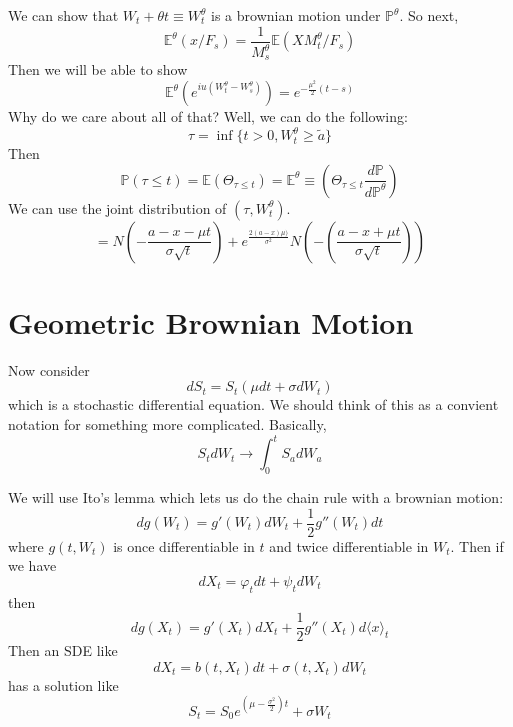 \documentclass[twocolumn,openany]{book}
\begin{document}
We can show that $W_t + \theta t \equiv W_t^\theta$ is a brownian motion under $\mathbb{P}^\theta$. So next,
\begin{equation}
	\mathbb{E}^\theta \left( x / F_s\right) = \frac{1}{M^\theta_s} \mathbb{E}(X M^\theta_t / F_s) 
\end{equation}
Then we will be able to show
\begin{equation}
	\mathbb{E}^\theta \left( e^{iu(W_t^\theta - W_s^\theta)} \right) = e^{-\frac{\mu^2}{2}(t-s)}
\end{equation}
Why do we care about all of that? Well, we can do the following:
\begin{equation}
	\tau = \inf \{ t> 0, W_t^\theta \geq \tilde{a} \}
\end{equation}
Then
\begin{equation}
	\mathbb{P}(\tau \leq t) = \mathbb{E}(\Theta_{\tau \leq t}) = \mathbb{E}^\theta \equiv \left( \Theta_{\tau \leq t} \frac{d\mathbb{P}}{d\mathbb{P}^\theta} \right)
\end{equation}
We can use the joint distribution of $(\tau, W_t^\theta)$.
\begin{equation}
	= N( -\frac{a - x - \mu t}{\sigma \sqrt{t}}) + e^{\frac{2(a-x)\mu)}{\sigma^2}} N(-\left( \frac{a - x + \mu t}{\sigma \sqrt{t}}\right))
\end{equation}

\section{Geometric Brownian Motion}
Now consider
\begin{equation}
	dS_t = S_t (\mu dt + \sigma dW_t)
\end{equation}
which is a stochastic differential equation. We should think of this as a convient notation for something more complicated. Basically,
\begin{equation}
	S_t dW_t \to \int_0^t S_a dW_a
\end{equation}

We will use Ito's lemma which lets us do the chain rule with a brownian motion:
\begin{equation}
	dg(W_t) = g'(W_t) dW_t + \frac12 g''(W_t)dt
\end{equation}
where $g(t,W_t)$ is once differentiable in $t$ and twice differentiable in $W_t$. Then if we have
\begin{equation}
	dX_t = \varphi_t dt + \psi_t dW_t
\end{equation}
then
\begin{equation}
	dg(X_t)  = g'(X_t)dX_t + \frac{1}{2} g''(X_t)d\langle x\rangle_t
\end{equation}
Then an SDE like
\begin{equation}
	dX_t = b(t,X_t)dt + \sigma(t,X_t) dW_t
\end{equation}
has a solution like
\begin{equation}
	S_t = S_0 e^{(\mu - \frac{\sigma^2}{2})t} + \sigma W_t
\end{equation}
\end{document}
